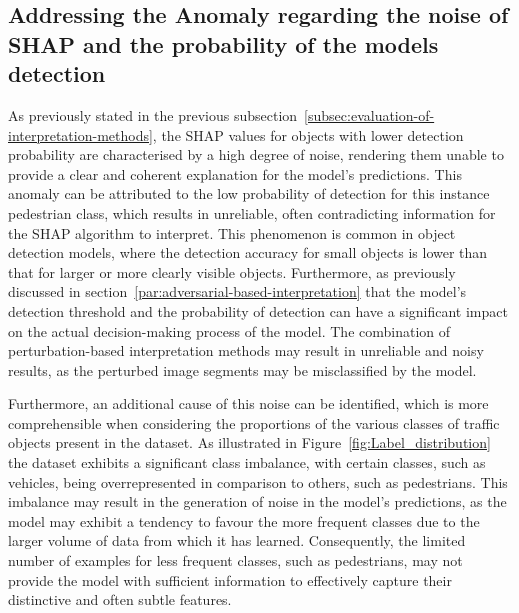 \subsection{Addressing the Anomaly regarding the noise of SHAP and the probability of the models detection}\label{subsec:Addressing the Anomaly regarding SHAP and the probability of detection}

As previously stated in the previous subsection~\ref{subsec:evaluation-of-interpretation-methods},
the SHAP values for objects with lower detection probability are characterised by a high degree of noise,
rendering them unable to provide a clear and coherent explanation for the model's predictions.
This anomaly can be attributed to the low probability of detection for this instance pedestrian class, which results in unreliable,
often contradicting information for the SHAP algorithm to interpret.
This phenomenon is common in object detection models, where the detection accuracy for small objects is lower than that for larger or more clearly visible objects.
Furthermore, as previously discussed in section~\ref{par:adversarial-based-interpretation} that the model's detection threshold and the probability of detection can
have a significant impact on the actual decision-making process of the model.
The combination of perturbation-based interpretation methods may result in unreliable and noisy results, as the perturbed image segments may be misclassified by the model.

Furthermore, an additional cause of this noise can be identified, which is more comprehensible when considering the proportions of the various classes of traffic objects present in the dataset.
As illustrated in Figure~\ref{fig:Label_distribution} the dataset exhibits a significant class imbalance, with certain classes, such as vehicles, being overrepresented in comparison to others, such as pedestrians.
This imbalance may result in the generation of noise in the model's predictions, as the model may exhibit a tendency to favour the more frequent classes due to the larger volume of data from which it has learned.
Consequently, the limited number of examples for less frequent classes, such as pedestrians, may not provide the model with sufficient information to effectively capture their distinctive and often subtle features.

